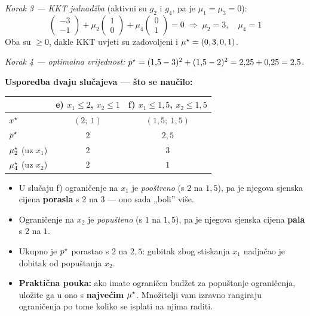 \begin{zadatak}
\emph{Korak 3 --- KKT jednadžba} (aktivni su $g_2$ i $g_4$, pa je
$\mu_1 = \mu_3 = 0$):
\[
\begin{pmatrix}-3\\-1\end{pmatrix}
+ \mu_2\begin{pmatrix}1\\0\end{pmatrix}
+ \mu_4\begin{pmatrix}0\\1\end{pmatrix} = 0
\;\Longrightarrow\;
\mu_2 = 3, \quad \mu_4 = 1
\]
Oba su $\ge 0$, dakle KKT uvjeti su zadovoljeni i
$\mu^{\star} = (0,3,0,1)$. \checkmark

\emph{Korak 4 --- optimalna vrijednost:}
$p^{\star} = (1{,}5-3)^2 + (1{,}5-2)^2 = 2{,}25 + 0{,}25 = 2{,}5$.

\textbf{Usporedba dvaju slučajeva --- što se naučilo:}

\begin{center}
\begin{tabular}{lcc}
\toprule
& \textbf{e)} $x_1\le2$, $x_2\le1$ & \textbf{f)} $x_1\le1{,}5$, $x_2\le1{,}5$ \\
\midrule
$x^{\star}$ & $(2;\ 1)$ & $(1{,}5;\ 1{,}5)$ \\
$p^{\star}$ & $2$ & $2{,}5$ \\
$\mu_2^{\star}$ (uz $x_1$) & $2$ & $3$ \\
$\mu_4^{\star}$ (uz $x_2$) & $2$ & $1$ \\
\bottomrule
\end{tabular}
\end{center}

\begin{itemize}
  \item U slučaju f) ograničenje na $x_1$ je \emph{pooštreno} (s $2$ na
        $1{,}5$), pa je njegova sjenska cijena \textbf{porasla} s $2$ na $3$ ---
        ono sada „boli” više.
  \item Ograničenje na $x_2$ je \emph{popušteno} (s $1$ na $1{,}5$), pa je
        njegova sjenska cijena \textbf{pala} s $2$ na $1$.
  \item Ukupno je $p^{\star}$ porastao s $2$ na $2{,}5$: gubitak zbog stiskanja
        $x_1$ nadjačao je dobitak od popuštanja $x_2$.
  \item \textbf{Praktična pouka:} ako imate ograničen budžet za popuštanje
        ograničenja, uložite ga u ono s \textbf{najvećim} $\mu^{\star}$. Množitelji
        vam izravno rangiraju ograničenja po tome koliko se isplati na njima
        raditi.
\end{itemize}
\end{zadatak}

